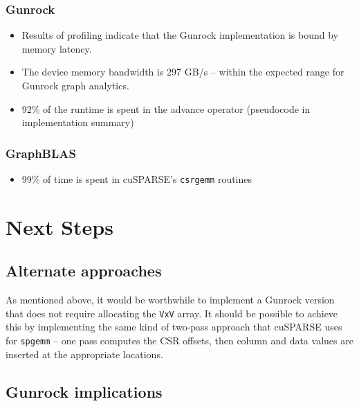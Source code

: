 \documentclass[10pt,oneside]{memoir}
\providecommand{\tightlist}{%
  \setlength{\itemsep}{0pt}\setlength{\parskip}{0pt}}
\begin{document}
\hypertarget{gunrock-3}{%
\subsubsection{Gunrock}\label{gunrock-3}}

\begin{itemize}
\tightlist
\item
  Results of profiling indicate that the Gunrock implementation is bound
  by memory latency.
\item
  The device memory bandwidth is 297 GB/s -- within the expected range
  for Gunrock graph analytics.
\item
  92\% of the runtime is spent in the advance operator (pseudocode in
  implementation summary)
\end{itemize}

\hypertarget{graphblas-3}{%
\subsubsection{GraphBLAS}\label{graphblas-3}}

\begin{itemize}
\tightlist
\item
  99\% of time is spent in cuSPARSE's \texttt{csrgemm} routines
\end{itemize}

\hypertarget{next-steps-6}{%
\section{Next Steps}\label{next-steps-6}}

\hypertarget{alternate-approaches-5}{%
\subsection{Alternate approaches}\label{alternate-approaches-5}}

As mentioned above, it would be worthwhile to implement a Gunrock
version that does not require allocating the
\texttt{\textbar{}V\textbar{}x\textbar{}V\textbar{}} array. It should be
possible to achieve this by implementing the same kind of two-pass
approach that cuSPARSE uses for \texttt{spgemm} -- one pass computes the
CSR offsets, then column and data values are inserted at the appropriate
locations.

\hypertarget{gunrock-implications-5}{%
\subsection{Gunrock implications}\label{gunrock-implications-5}}
\end{document}
